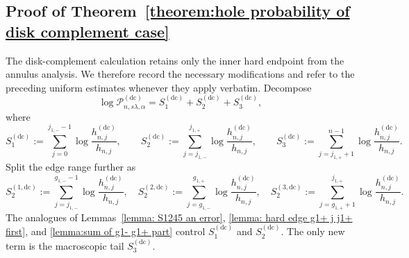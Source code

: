 \documentclass[a4paper]{article}
\numberwithin{equation}{section}
\begin{document}
\subsection{Proof of Theorem~\ref{theorem:hole probability of disk complement case}}
The disk-complement calculation retains only the inner hard endpoint from the annulus analysis. We therefore record the necessary modifications and refer to the preceding uniform estimates whenever they apply verbatim. Decompose
\[
  \log\mathcal{P}_{n,s\lambda,\alpha}^{(\mathrm{dc})}
  =
  S_1^{(\mathrm{dc})}+S_2^{(\mathrm{dc})}+S_3^{(\mathrm{dc})},
\]
where 
\[
    S_1^{(\mathrm{dc})}:=\sum_{j=0}^{j_{1,-}-1}\log\frac{h_{n,j}^{(\mathrm{dc})}}{h_{n,j}}, 
    \qquad
    S_2^{(\mathrm{dc})}:=\sum_{j=j_{1,-}}^{j_{1,+}}\log\frac{h_{n,j}^{(\mathrm{dc})}}{h_{n,j}}, 
    \qquad
    S_3^{(\mathrm{dc})}:=\sum_{j=j_{1,+}+1}^{n-1}\log\frac{h_{n,j}^{(\mathrm{dc})}}{h_{n,j}}.
\]
Split the edge range further as
\[
S_2^{(1,\mathrm{dc})}:=\sum_{j=j_{1,-}}^{g_{1,-}-1}\log\frac{h_{n,j}^{(\mathrm{dc})}}{h_{n,j}},\quad
S_2^{(2,\mathrm{dc})}:=\sum_{j=g_{1,-}}^{g_{1,+}}\log\frac{h_{n,j}^{(\mathrm{dc})}}{h_{n,j}},\quad
S_2^{(3,\mathrm{dc})}:=\sum_{j=g_{1,+}+1}^{j_{1,+}}\log\frac{h_{n,j}^{(\mathrm{dc})}}{h_{n,j}}.
\]
The analogues of Lemmas~\ref{lemma: S1245 an error}, \ref{lemma: hard edge g1+ j j1+ first}, and \ref{lemma:sum of g1- g1+ part} control $S_1^{(\mathrm{dc})}$ and $S_2^{(\mathrm{dc})}$. The only new term is the macroscopic tail $S_3^{(\mathrm{dc})}$.
\end{document}
